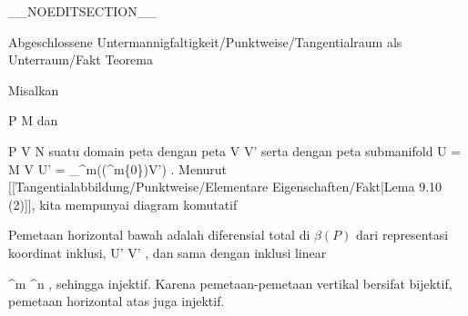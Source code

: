 __NOEDITSECTION__

{Abgeschlossene Untermannigfaltigkeit/Punktweise/Tangentialraum als Unterraum/Fakt}
{Teorema}
{}
{

\faktzusatz {}

}
{

Misalkan

\mavergleichskette
{\vergleichskette
{ P
}
{ \in }{ M
}
{  }{
}
{    }{
}
{   }{
}
}
{}{}{}
dan

\mavergleichskette
{\vergleichskette
{ P
}
{ \in }{ V
}
{ \subseteq }{ N
}
{    }{
}
{   }{
}
}
{}{}{}
suatu domain peta dengan peta
\maabbdisp {\alpha} { V } { V'
} {}
serta dengan peta submanifold
 {U = M \cap  V } { U' = _{\R^m}\bigl((\R^m\times\{0\})\cap V'\bigr)
} {.}
Menurut
[[Tangentialabbildung/Punktweise/Elementare Eigenschaften/Fakt|Lema 9.10  (2)]],
kita mempunyai diagram komutatif

 {  }

Pemetaan horizontal bawah adalah diferensial total di $\beta(P)$ dari representasi koordinat inklusi,
 {U'} {V'
} {,}
dan sama dengan inklusi linear

\mavergleichskette
{\vergleichskette
{ \R^m
}
{ \subseteq }{\R^n
}
{  }{
}
{    }{
}
{   }{
}
}
{}{}{,}
sehingga injektif. Karena pemetaan-pemetaan vertikal bersifat bijektif, pemetaan horizontal atas juga injektif.

}

